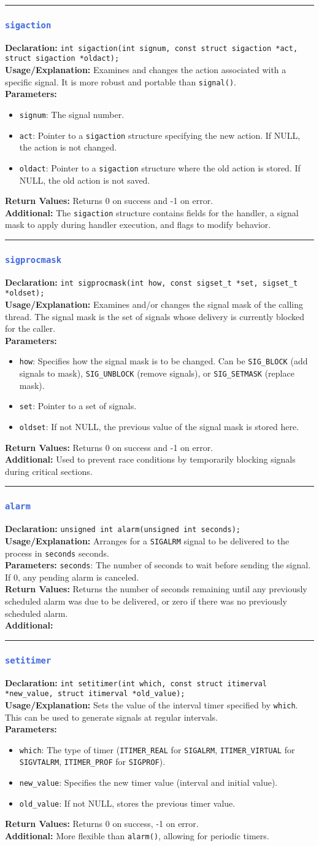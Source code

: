\documentclass[openany,12pt]{book}
\newcommand{\code}[1]{\texttt{#1}}
\newcommand{\blue}[1]{\textcolor{RoyalBlue}{#1}}
\newcommand{\functionEntry}[6]{%
  \noindent\rule{\linewidth}{0.5pt}
  \subsubsection*{\blue{\large{\texttt{#1}}}}
  \textbf{Declaration:} \texttt{#2} \\
  \textbf{Usage/Explanation:} #3 \\
  \textbf{Parameters:} #4 \\
  \textbf{Return Values:} #5 \\
  \textbf{Additional:} #6
  \vspace{1em}
}
\newcommand{\functionEntryPar}[6]{%
  \noindent\rule{\linewidth}{0.5pt}
  \subsubsection*{\blue{\large{\texttt{#1}}}}
  \textbf{Declaration:} \texttt{#2} \\
  \textbf{Usage/Explanation:} #3 \\
  \textbf{Parameters:}
  \begin{itemize}[leftmargin=*]
    #4
  \end{itemize}
  \textbf{Return Values:} #5 \\
  \textbf{Additional:} #6
  \vspace{1em}
}
\begin{document}
\functionEntryPar{sigaction}
{int sigaction(int signum, const struct sigaction *act, struct sigaction *oldact);}
{Examines and changes the action associated with a specific signal. It is more robust and portable than \code{signal()}.}
{\item \code{signum}: The signal number.
 \item \code{act}: Pointer to a \code{sigaction} structure specifying the new action. If NULL, the action is not changed.
 \item \code{oldact}: Pointer to a \code{sigaction} structure where the old action is stored. If NULL, the old action is not saved.}
{Returns 0 on success and -1 on error.}
{The \code{sigaction} structure contains fields for the handler, a signal mask to apply during handler execution, and flags to modify behavior.\label{func:sigaction}}

\functionEntryPar{sigprocmask}
{int sigprocmask(int how, const sigset\_t *set, sigset\_t *oldset);}
{Examines and/or changes the signal mask of the calling thread. The signal mask is the set of signals whose delivery is currently blocked for the caller.}
{\item \code{how}: Specifies how the signal mask is to be changed. Can be \code{SIG\_BLOCK} (add signals to mask), \code{SIG\_UNBLOCK} (remove signals), or \code{SIG\_SETMASK} (replace mask).
 \item \code{set}: Pointer to a set of signals.
 \item \code{oldset}: If not NULL, the previous value of the signal mask is stored here.}
{Returns 0 on success and -1 on error.}
{Used to prevent race conditions by temporarily blocking signals during critical sections.\label{func:sigprocmask}}

\functionEntry{alarm}
{unsigned int alarm(unsigned int seconds);}
{Arranges for a \code{SIGALRM} signal to be delivered to the process in \code{seconds} seconds.}
{\code{seconds}: The number of seconds to wait before sending the signal. If 0, any pending alarm is canceled.}
{Returns the number of seconds remaining until any previously scheduled alarm was due to be delivered, or zero if there was no previously scheduled alarm.}
{\label{func:alarm}}

\functionEntryPar{setitimer}
{int setitimer(int which, const struct itimerval *new\_value, struct itimerval *old\_value);}
{Sets the value of the interval timer specified by \code{which}. This can be used to generate signals at regular intervals.}
{\item \code{which}: The type of timer (\code{ITIMER\_REAL} for \code{SIGALRM}, \code{ITIMER\_VIRTUAL} for \code{SIGVTALRM}, \code{ITIMER\_PROF} for \code{SIGPROF}).
 \item \code{new\_value}: Specifies the new timer value (interval and initial value).
 \item \code{old\_value}: If not NULL, stores the previous timer value.}
{Returns 0 on success, -1 on error.}
{More flexible than \code{alarm()}, allowing for periodic timers.\label{func:setitimer}}
\end{document}

